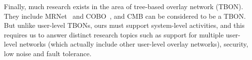 %
Finally, much research exists in the area of tree-based overlay network (TBON). 
They include MRNet~\cite{mrnet} and COBO~\cite{launchmon}, and 
CMB can be considered to be a TBON. But unlike user-level
TBONs, ours must support system-level activities, and this 
requires us to answer distinct research topics
such as support for multiple user-level networks (which actually
include other user-level overlay networks), security, low noise 
and fault tolerance. 

